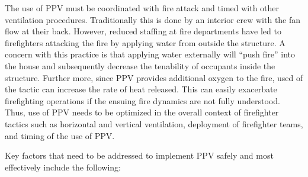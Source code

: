\documentclass{article}
\begin{document}
The use of PPV must be coordinated with fire attack and timed with other ventilation procedures. Traditionally this is done by an interior crew with the fan flow at their back. However, reduced staffing at fire departments have led to firefighters attacking the fire by applying water from outside the structure. A concern with this practice is that applying water externally will “push fire” into the house and subsequently decrease the tenability of occupants inside the structure. Further more, since PPV provides additional oxygen to the fire, used of the tactic can increase the rate of heat released. This can easily exacerbate firefighting operations if the ensuing fire dynamics are not fully understood. Thus, use of PPV needs to be optimized in the overall context of firefighter tactics such as horizontal and vertical ventilation, deployment of firefighter teams, and timing of the use of PPV.

Key factors that need to be addressed to implement PPV safely and most effectively include
the following:
\end{document}
